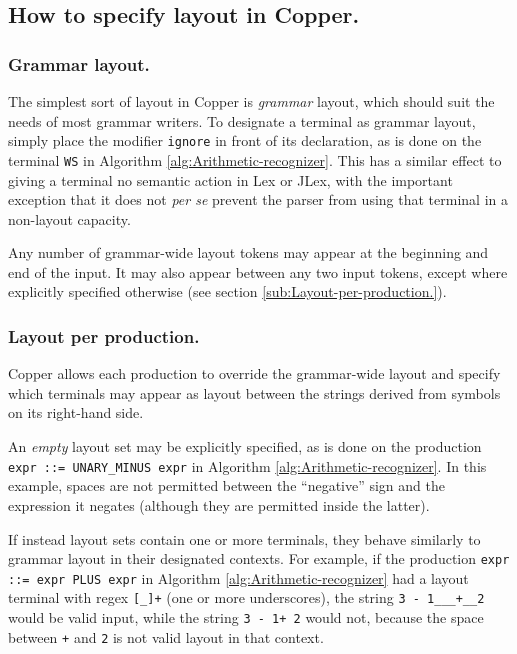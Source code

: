 \documentclass[12pt,english,twoside]{report}
\begin{document}
\subsection{How to specify layout in Copper.}


\subsubsection{Grammar layout.}

The simplest sort of layout in Copper is \emph{grammar} layout,
which should suit the needs of most grammar writers. To designate
a terminal as grammar layout, simply place the modifier \texttt{ignore}
in front of its declaration, as is done on the terminal \texttt{WS}
in Algorithm \ref{alg:Arithmetic-recognizer}. This has a similar
effect to giving a terminal no semantic action in Lex or JLex, with
the important exception that it does not \emph{per se} prevent the
parser from using that terminal in a non-layout capacity.

Any number of grammar-wide layout tokens may appear at the beginning
and end of the input. It may also appear between any two input tokens,
except where explicitly specified otherwise (see section \ref{sub:Layout-per-production.}).

\subsubsection{\label{sub:Layout-per-production.}Layout per production.}

Copper allows each production to override the grammar-wide layout
and specify which terminals may appear as layout between the strings
derived from symbols on its right-hand side.

An \emph{empty} layout set may be explicitly specified, as is done
on the production\\
 \texttt{expr~::=~UNARY\_MINUS~expr} in Algorithm \ref{alg:Arithmetic-recognizer}.
In this example, spaces are not permitted between the {}``negative''
sign and the expression it negates (although they are permitted inside
the latter).

If instead layout sets contain one or more terminals, they behave
similarly to grammar layout in their designated contexts. For example,
if the production \texttt{expr ::= expr PLUS expr} in Algorithm \ref{alg:Arithmetic-recognizer}
had a layout terminal with regex \texttt{{[}\_]+} (one or more underscores),
the string \texttt{3~-~1\_\_\_+\_\_2} would be valid input, while
the string \texttt{3~-~1+~2} would not, because the space between
\texttt{+} and \texttt{2} is not valid layout in that context.
\end{document}
